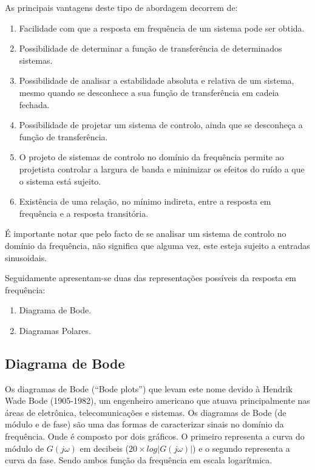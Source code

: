 As principais vantagens deste tipo de abordagem decorrem de:
\begin{enumerate}
	\item Facilidade com que a resposta em frequência de um sistema pode ser obtida. 
	\item Possibilidade de determinar a função de transferência de determinados sistemas. 
	\item Possibilidade de analisar a estabilidade absoluta e relativa de um sistema, mesmo quando se desconhece a sua função de transferência em cadeia fechada.
	\item Possibilidade de projetar um sistema de controlo, ainda que se desconheça a função
	de transferência. 
	\item O projeto de sistemas de controlo no domínio da frequência permite ao projetista controlar a largura de banda e minimizar os efeitos do ruído a que o sistema está sujeito.
	\item Existência de uma relação, no mínimo indireta, entre a resposta em frequência e a resposta transitória. 
	
\end{enumerate}

É importante notar que pelo facto de se analisar um sistema de controlo no domínio da frequência, não significa que alguma vez, este esteja sujeito a entradas sinusoidais. 


Seguidamente apresentam-se duas das representações possíveis da resposta em frequência: 
\begin{enumerate}
	\item Diagrama de Bode.
	\item Diagramas Polares.
\end{enumerate}




\subsection{Diagrama de Bode}

Os diagramas de Bode (“Bode plots”) que levam este
nome devido à Hendrik Wade Bode (1905-1982), um engenheiro americano que atuava principalmente nas áreas de eletrônica, telecomunicações e sistemas. Os diagramas de Bode (de módulo e de fase) são uma das formas de caracterizar sinais no domínio da frequência. Onde é composto por dois gráficos. O primeiro representa a curva do módulo de $ G(j\omega) $ em decibeis ($ 20 \times log|G(j\omega)| $) e o segundo representa a curva da fase. Sendo ambos função da frequência em escala logarítmica.

